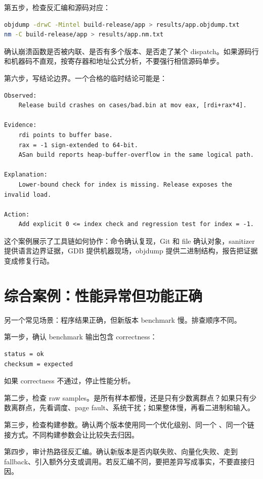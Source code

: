 第五步，检查反汇编和源码对应：

\begin{lstlisting}[language=bash]
objdump -drwC -Mintel build-release/app > results/app.objdump.txt
nm -C build-release/app > results/app.nm.txt
\end{lstlisting}

确认崩溃函数是否被内联、是否有多个版本、是否走了某个 dispatch。如果源码行和机器码不直观，按寄存器和地址公式分析，不要强行相信源码单步。

第六步，写结论边界。一个合格的临时结论可能是：

\begin{lstlisting}
Observed:
    Release build crashes on cases/bad.bin at mov eax, [rdi+rax*4].

Evidence:
    rdi points to buffer base.
    rax = -1 sign-extended to 64-bit.
    ASan build reports heap-buffer-overflow in the same logical path.

Explanation:
    Lower-bound check for index is missing. Release exposes the invalid load.

Action:
    Add explicit 0 <= index check and regression test for index = -1.
\end{lstlisting}

这个案例展示了工具链如何协作：命令确认复现，Git 和 file 确认对象，sanitizer 提供语言边界证据，GDB 提供机器现场，objdump 提供二进制结构，报告把证据变成修复行动。

\section{综合案例：性能异常但功能正确}

另一个常见场景：程序结果正确，但新版本 benchmark 慢。排查顺序不同。

第一步，确认 benchmark 输出包含 correctness：

\begin{lstlisting}
status = ok
checksum = expected
\end{lstlisting}

如果 correctness 不通过，停止性能分析。

第二步，检查 raw samples。是所有样本都慢，还是只有少数离群点？如果只有少数离群点，先看调度、page fault、系统干扰；如果整体慢，再看二进制和输入。

第三步，检查构建参数。确认两个版本使用同一个优化级别、同一个 、同一个链接方式。不同构建参数会让比较失去归因。

第四步，审计热路径反汇编。确认新版本是否内联失败、向量化失败、走到 fallback、引入额外分支或调用。若反汇编不同，要把差异写成事实，不要直接归因。

